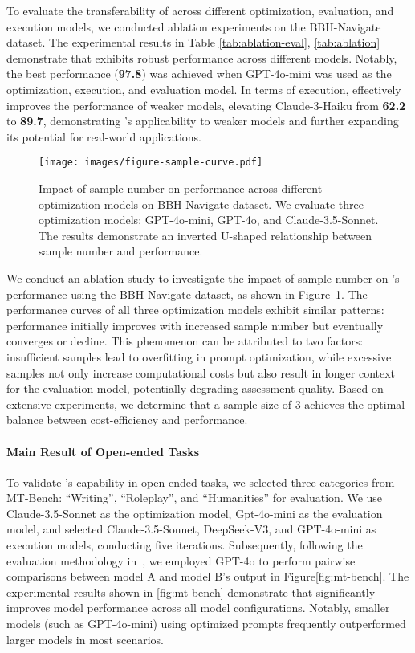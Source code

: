 To evaluate the transferability of \ours across different optimization, evaluation, and execution models, we conducted ablation experiments on the BBH-Navigate dataset. The experimental results in Table \ref{tab:ablation-eval}, \ref{tab:ablation} demonstrate that \ours exhibits robust performance across different models. Notably, the best performance (\textbf{97.8}) was achieved when GPT-4o-mini was used as the optimization, execution, and evaluation model.  In terms of execution, \ours effectively improves the performance of weaker models, elevating Claude-3-Haiku from \textbf{62.2} to \textbf{89.7}, demonstrating \ours's applicability to weaker models and further expanding its potential for real-world applications.

\begin{figure}[t!]
  \centering
  \texttt{[image: images/figure-sample-curve.pdf]}
  \vspace{-2em}
  \caption{Impact of sample number on performance across different optimization models on BBH-Navigate dataset. We evaluate three optimization models: GPT-4o-mini, GPT-4o, and Claude-3.5-Sonnet. The results demonstrate an inverted U-shaped relationship between sample number and performance.}
  \label{fig:sample}
\end{figure}

We conduct an ablation study to investigate the impact of sample number on \ours's performance using the BBH-Navigate dataset, as shown in Figure~\ref{fig:sample}. The performance curves of all three optimization models exhibit similar patterns: performance initially improves with increased sample number but eventually  converges or decline. This phenomenon can be attributed to two factors: insufficient samples lead to overfitting in prompt optimization, while excessive samples not only increase computational costs but also result in longer context for the evaluation model, potentially degrading assessment quality. Based on extensive experiments, we determine that a sample size of 3 achieves the optimal balance between cost-efficiency and performance.

\paragraph{Main Result of Open-ended Tasks}

To validate \ours's capability in open-ended tasks, we selected three categories from MT-Bench: ``Writing'', ``Roleplay'', and ``Humanities'' for evaluation. We use Claude-3.5-Sonnet as the optimization model, Gpt-4o-mini as the evaluation model, and selected Claude-3.5-Sonnet, DeepSeek-V3, and GPT-4o-mini as execution models, conducting five iterations. Subsequently, following the evaluation methodology in~\cite{lianmin2023mtbench}, we employed GPT-4o to perform pairwise comparisons between model A and model B's output in Figure\ref{fig:mt-bench}. The experimental results shown in \ref{fig:mt-bench} demonstrate that \ours significantly improves model performance across all model configurations. 
Notably, smaller models (such as GPT-4o-mini) using optimized prompts frequently outperformed larger models in most scenarios.

